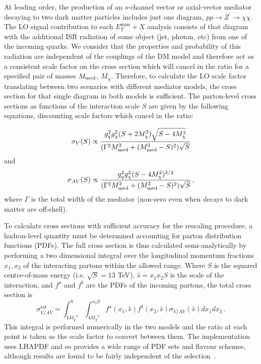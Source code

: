 \documentclass[a4paper, 11pt,notoc]{article}
\newcommand{\MET}{\ensuremath{E_T^\mathrm{miss}}\xspace}
\newcommand{\mDM}{\ensuremath{M_{\chi}}\xspace}
\newcommand{\mMed}{\ensuremath{M_{\rm{med}}}\xspace}
\newcommand{\metplusx}{\ensuremath{\MET+X}\xspace}
\begin{document}
At leading order, the production of an $s$-channel vector or axial-vector mediator decaying to two dark matter particles includes just one diagram, $pp\rightarrow Z^\prime \rightarrow \chi \chi$. The LO signal contribution to each \metplusx analysis consists of that diagram with the additional ISR radiation of some object (jet, photon, etc) from one of the incoming quarks. We consider that the properties and probability of this radiation are independent of the couplings of the DM model and therefore act as a consistent scale factor on the cross section which will cancel in the ratio for a specified pair of masses \mMed, \mDM. Therefore, to calculate the LO scale factor translating between two scenarios with different mediator models, the cross section for that single diagram in both models is sufficient. The parton-level cross sections as functions of the interaction scale $S$ are given by the following equations, discounting scale factors which cancel in the ratio:

\begin{equation}
\sigma_V(S) \propto \frac{g_q^2 g_\chi^2 (S + 2\mDM^2)\sqrt{S-4\mDM^2}}{(\Gamma^2\mMed^2 + (\mMed^2 - S)^2)\sqrt{S}}
\end{equation}
and
\begin{equation}
\sigma_{AV}(S) \propto \frac{g_q^2 g_\chi^2 (S-4\mDM^2)^{3/2}}{(\Gamma^2\mMed^2 + (\mMed^2 - S)^2)\sqrt{S}}\,,
\end{equation}
where $\Gamma$ is the total width of the mediator (non-zero even when decays to dark matter are off-shell).

To calculate cross sections with sufficient accuracy for the rescaling procedure, a hadron-level quantity must be determined accounting for parton distribution functions (PDFs). The full cross section is thus calculated semi-analytically by performing a two dimensional integral over the longitudinal momentum fractions $x_1, x_2$ of the interacting partons within the allowed range. Where $S$ is the squared centre-of-mass energy (i.e. $\sqrt{S} = 13$ TeV), $\hat{s} = x_1 x_2 S$ is the scale of the interaction, and $f^a$ and $f^b$ are the PDFs of the incoming partons, the total cross section is
\begin{equation}
\sigma_{V/AV}^{\text{tot}} = \int_{4 \mDM^2}^{\text{S}} \int_{4 \mDM^2}^{x_2 S}  f^a(x_1,\hat{s})  f^b(x_2,\hat{s}) \sigma_{V/AV}(\hat{s}) dx_1 dx_2\,.
\end{equation}
This integral is performed numerically in the two models and the ratio at each point is taken as the scale factor to convert between them. The implementation uses LHAPDF and so provides a wide range of PDF sets and flavour schemes, although results are found to be fairly independent of the selection~\cite{Buckley:2014ana}.
\end{document}
